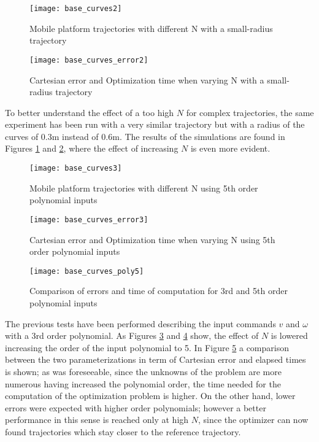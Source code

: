 \begin{figure}[!h]
	\centering
	\texttt{[image: base\_curves2]}
	\caption{Mobile platform trajectories with different N with a small-radius trajectory}
	\label{base_curves2}
\end{figure}
\begin{figure}[!h]
	\texttt{[image: base\_curves\_error2]}
	\centering
	\caption{Cartesian error and Optimization time when varying N with a small-radius trajectory}
	\label{base_curves_errors2}
\end{figure}
To better understand the effect of a too high $N$ for complex trajectories, the same experiment has been run with a very similar trajectory but with a radius of the curves of $0.3$m instead of $0.6$m. The results of the simulations are found in Figures \ref{base_curves2} and \ref{base_curves_errors2}, where the effect of increasing $N$ is even more evident.
\begin{figure}[h!]
	\centering
	\texttt{[image: base\_curves3]}
	\caption{Mobile platform trajectories with different N using 5th order polynomial inputs}
	\label{base_curves3}
\end{figure}
\begin{figure}[h!]
	\texttt{[image: base\_curves\_error3]}
	\centering
	\caption{Cartesian error and Optimization time when varying N using 5th order polynomial inputs}
	\label{base_curves_errors3}
\end{figure}
\begin{figure}[h!]
	\centering
	\texttt{[image: base\_curves\_poly5]}
	\caption{Comparison of errors and time of computation for 3rd and 5th order polynomial inputs}
	\label{base_curves_poly5}
\end{figure}
The previous tests have been performed describing the input commands $v$ and $\omega$ with a 3rd order polynomial. As Figures \ref{base_curves3} and \ref{base_curves_errors3} show, the effect of $N$ is lowered increasing the order of the input polynomial to 5. In Figure \ref{base_curves_poly5} a comparison between the two parameterizations in term of Cartesian error and elapsed times is shown; as was foreseeable, since the unknowns of the problem are more numerous having increased the polynomial order, the time needed for the computation of the optimization problem is higher. On the other hand, lower errors were expected with higher order polynomials; however a better performance in this sense is reached only at high $N$, since the optimizer can now found trajectories which stay closer to the reference trajectory.

